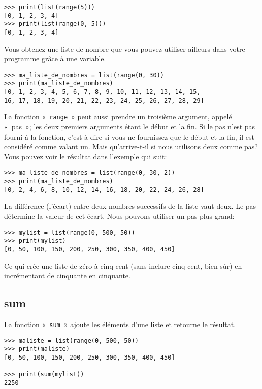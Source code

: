 \begin{Verbatim}[frame=single,rulecolor=\color{gray}]
>>> print(list(range(5)))
[0, 1, 2, 3, 4]
>>> print(list(range(0, 5)))
[0, 1, 2, 3, 4]
\end{Verbatim}

Vous obtenez une liste de nombre que vous pouvez utiliser ailleurs dans votre programme grâce à une variable.

\begin{Verbatim}[frame=single,rulecolor=\color{gray}]
>>> ma_liste_de_nombres = list(range(0, 30))
>>> print(ma_liste_de_nombres)
[0, 1, 2, 3, 4, 5, 6, 7, 8, 9, 10, 11, 12, 13, 14, 15, 
16, 17, 18, 19, 20, 21, 22, 23, 24, 25, 26, 27, 28, 29]
\end{Verbatim}

La fonction «~\texttt{range}~» peut aussi prendre un troisième argument, appelé «~pas~»; les deux premiers arguments étant le début et la fin.
Si le pas n'est pas fourni à la fonction, c'est à dire si vous ne fournissez que le début et la fin, il est considéré comme valant un. Mais qu'arrive-t-il si nous utilisons deux comme pas? Vous pouvez voir le résultat dans l'exemple qui suit:
\begin{Verbatim}[frame=single,rulecolor=\color{gray}]
>>> ma_liste_de_nombres = list(range(0, 30, 2))
>>> print(ma_liste_de_nombres)
[0, 2, 4, 6, 8, 10, 12, 14, 16, 18, 20, 22, 24, 26, 28]
\end{Verbatim}

La différence (l'écart) entre deux nombres successifs de la liste vaut deux. Le pas détermine la valeur de cet écart. Nous pouvons utiliser un pas plus grand:
\begin{Verbatim}[frame=single,rulecolor=\color{gray}]
>>> mylist = list(range(0, 500, 50))
>>> print(mylist)
[0, 50, 100, 150, 200, 250, 300, 350, 400, 450]
\end{Verbatim}

Ce qui crée une liste de zéro à cinq cent (sans inclure cinq cent, bien sûr) en incrémentant de cinquante en cinquante.

\subsection*{sum}

La fonction «~\texttt{sum}~» ajoute les éléments d'une liste et retourne le résultat.
\begin{Verbatim}[frame=single,rulecolor=\color{gray}]
>>> maliste = list(range(0, 500, 50))
>>> print(maliste)
[0, 50, 100, 150, 200, 250, 300, 350, 400, 450]

>>> print(sum(mylist))
2250
\end{Verbatim}

\newpage